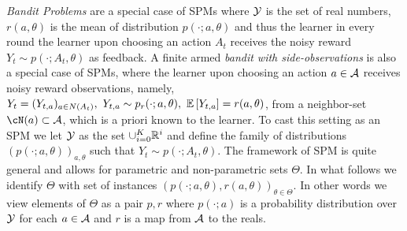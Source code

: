 \emph{Bandit Problems} are a special case of SPMs where 
$\mathcal{Y}$ is the set of real numbers, $r(a,\theta)$ is the mean of distribution $p(\cdot;a,\theta)$ and thus the learner in every round the learner upon choosing an action $A_t$ receives the noisy reward $Y_t \sim p(\cdot;A_t,\theta)$ as feedback. 
A finite armed \emph{bandit with side-observations} \cite{MaSh11} is also a special case of SPMs, where the learner upon choosing an action $a \in \mathcal{A}$ receives noisy reward observations, namely, $Y_t  = (Y_{t,a})_{a\in N(A_t)},\,\,Y_{t,a} \sim p_r(\cdot;a,\theta),\,\,\mathbb{E}\left[Y_{t,a}\right] = r(a,\theta)$, from a neighbor-set $\cN(a) \subset \A$, which is a priori known to the learner. 
%
%
%
To cast this setting as an SPM we let $\mathcal{Y}$ as the set $\cup_{i=0}^K \mathbb{R}^i$ and define 
the family of distributions $(p(\cdot;a,\theta))_{a,\theta}$ such that $Y_t \sim p(\cdot;A_t,\theta)$.
The framework of SPM is quite general and allows for parametric and non-parametric sets $\Theta$. 
In what follows we identify $\Theta$ with set of instances $(p(\cdot;a,\theta),r(a,\theta))_{\theta\in \Theta}$.
In other words we view elements of $\Theta$ as a pair $p,r$ where $p(\cdot;a)$ is a probability distribution over $\mathcal{Y}$ for each $a\in \mathcal{A}$ and $r$ is a map from $\mathcal{A}$ to the reals.
